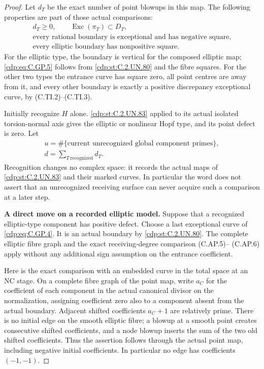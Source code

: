 \begin{proof}
Let \(d_T\) be the exact number of point blowups
in this map. The following properties are part
of those actual comparisons:
\[
\begin{gathered}
 d_T\ge0,\qquad
 \operatorname{Exc}(\pi_T)\subset D_T,\\
 \text{every rational boundary is exceptional
 and has negative square},\\
 \text{every elliptic boundary has nonpositive square}.
\end{gathered}
 \tag{C.GP.5}\label{cdp:eq:C.GP.5}
\]
For the elliptic type, the boundary is vertical
for the composed elliptic map; \eqref{cdp:eq:C.GP.5} follows
from \ref{cdp:st:C.2.UN.80} and the fibre squares. For the other
two types the entrance curve has square zero,
all point centres are away from it, and every
other boundary is exactly a positive discrepancy
exceptional curve, by (C.TI.2)--(C.TI.3).

Initially recognize \(H\) alone. \ref{cdp:st:C.2.UN.83} applied
to its actual isolated torsion-normal axis gives
the elliptic or nonlinear Hopf type, and its
point defect is zero. Let
\[
\begin{gathered}
 u=\#\{\text{current unrecognized global component primes}\},
 \\
 d=\sum_{T\ \mathrm{recognized}}d_T.
\end{gathered}
 \tag{C.GP.6}\label{cdp:eq:C.GP.6}
\]
Recognition changes no complex space: it records
the actual maps of \ref{cdp:st:C.2.UN.83} and their marked curves.
In particular the word does not assert that an
unrecognized receiving surface can never acquire
such a comparison at a later step.

\par\medskip\noindent\textbf{A direct move on a recorded elliptic model.}
Suppose that a recognized elliptic-type component
has positive defect. Choose a last exceptional
curve of \eqref{cdp:eq:C.GP.4}. It is an actual boundary by
\ref{cdp:st:C.2.UN.80}. The complete elliptic fibre graph and the
exact receiving-degree comparison (C.AP.5)--
(C.AP.6) apply without any additional sign
assumption on the entrance coefficient.

Here is the exact comparison with an embedded
curve in the total space at an NC stage. On a
complete fibre graph of the point map, write
\(a_C\) for the coefficient of each component
in the actual canonical divisor on the
normalization, assigning coefficient zero
also to a component absent from the actual
boundary. Adjacent shifted coefficients
\(a_C+1\) are relatively prime. There is no
initial edge on the smooth elliptic fibre;
a blowup at a smooth point creates consecutive
shifted coefficients, and a node blowup inserts
the sum of the two old shifted coefficients.
Thus the assertion follows through the actual
point map, including negative initial coefficients.
In particular no edge has coefficients
\((-1,-1)\).


\end{proof}
